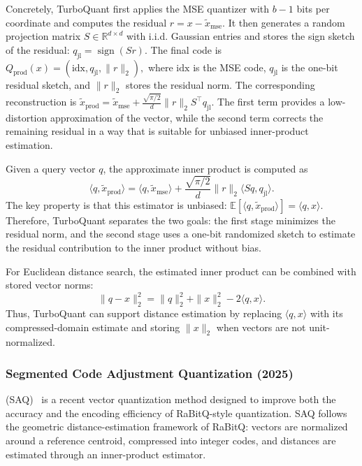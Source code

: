 \documentclass[sigconf]{acmart}
\begin{document}
Concretely, TurboQuant first applies the MSE quantizer with $b-1$ bits per coordinate and computes the residual
\(
r
=
x-\tilde{x}_{\mathrm{mse}}.
\)
It then generates a random projection matrix $S \in \mathbb{R}^{d \times d}$ with i.i.d. Gaussian entries and stores the sign sketch of the residual:
\(
q_{\mathrm{jl}}
=
\operatorname{sign}(Sr).
\)
The final code is
\(
Q_{\mathrm{prod}}(x)
=
(\mathrm{idx}, q_{\mathrm{jl}}, \|r\|_2),
\)
where $\mathrm{idx}$ is the MSE code, $q_{\mathrm{jl}}$ is the one-bit residual sketch, and $\|r\|_2$ stores the residual norm. 
The corresponding reconstruction is
\(
\tilde{x}_{\mathrm{prod}}
=
\tilde{x}_{\mathrm{mse}}
+
\frac{\sqrt{\pi/2}}{d}
\|r\|_2
S^\top q_{\mathrm{jl}} .
\)
The first term provides a low-distortion approximation of the vector, while the second term corrects the remaining residual in a way that is suitable for unbiased inner-product estimation.

Given a query vector $q$, the approximate inner product is computed as
\[
\langle q,\tilde{x}_{\mathrm{prod}}\rangle
=
\langle q,\tilde{x}_{\mathrm{mse}}\rangle
+
\frac{\sqrt{\pi/2}}{d}
\|r\|_2
\langle Sq, q_{\mathrm{jl}}\rangle .
\]
The key property is that this estimator is unbiased:
\(
\mathbb{E}
\left[
\langle q,\tilde{x}_{\mathrm{prod}}\rangle
\right]
=
\langle q,x\rangle .
\)
Therefore, TurboQuant separates the two goals: the first stage minimizes the residual norm, and the second stage uses a one-bit randomized sketch to estimate the residual contribution to the inner product without bias.

For Euclidean distance search, the estimated inner product can be combined with stored vector norms:
\[
\|q-x\|_2^2
=
\|q\|_2^2+\|x\|_2^2-2\langle q,x\rangle .
\]
Thus, TurboQuant can support distance estimation by replacing $\langle q,x\rangle$ with its compressed-domain estimate and storing $\|x\|_2$ when vectors are not unit-normalized.

\subsubsection{\textbf{Segmented Code Adjustment Quantization (2025)}}(SAQ)~\cite{li2025saq} is a recent vector quantization method designed to improve both the accuracy and the encoding efficiency of RaBitQ-style quantization. 
SAQ follows the geometric distance-estimation framework of RaBitQ: vectors are normalized around a reference centroid, compressed into integer codes, and distances are estimated through an inner-product estimator.
\end{document}
